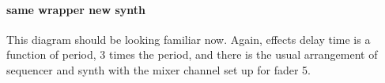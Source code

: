 \paragraph{same wrapper new synth}
This diagram should be looking familiar now. Again, effects delay
time is a function of period, 3 times the period, and there is
the usual arrangement of sequencer and synth with the mixer channel
set up for fader 5.
